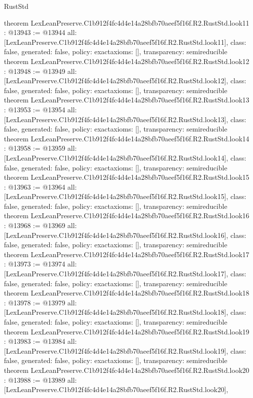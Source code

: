 \begin{lexlean}{RustStd}
\begin{coremodule}
{}
theorem LexLeanPreserve.C1b912f4fc4d4e14a28bfb70aeef5f16f.R2.RustStd.look11 : @13943 := @13944 {
  all: [LexLeanPreserve.C1b912f4fc4d4e14a28bfb70aeef5f16f.R2.RustStd.look11],
  class: false,
  generated: false,
  policy: exact{axioms: []},
  transparency: semireducible
}
theorem LexLeanPreserve.C1b912f4fc4d4e14a28bfb70aeef5f16f.R2.RustStd.look12 : @13948 := @13949 {
  all: [LexLeanPreserve.C1b912f4fc4d4e14a28bfb70aeef5f16f.R2.RustStd.look12],
  class: false,
  generated: false,
  policy: exact{axioms: []},
  transparency: semireducible
}
theorem LexLeanPreserve.C1b912f4fc4d4e14a28bfb70aeef5f16f.R2.RustStd.look13 : @13953 := @13954 {
  all: [LexLeanPreserve.C1b912f4fc4d4e14a28bfb70aeef5f16f.R2.RustStd.look13],
  class: false,
  generated: false,
  policy: exact{axioms: []},
  transparency: semireducible
}
theorem LexLeanPreserve.C1b912f4fc4d4e14a28bfb70aeef5f16f.R2.RustStd.look14 : @13958 := @13959 {
  all: [LexLeanPreserve.C1b912f4fc4d4e14a28bfb70aeef5f16f.R2.RustStd.look14],
  class: false,
  generated: false,
  policy: exact{axioms: []},
  transparency: semireducible
}
theorem LexLeanPreserve.C1b912f4fc4d4e14a28bfb70aeef5f16f.R2.RustStd.look15 : @13963 := @13964 {
  all: [LexLeanPreserve.C1b912f4fc4d4e14a28bfb70aeef5f16f.R2.RustStd.look15],
  class: false,
  generated: false,
  policy: exact{axioms: []},
  transparency: semireducible
}
theorem LexLeanPreserve.C1b912f4fc4d4e14a28bfb70aeef5f16f.R2.RustStd.look16 : @13968 := @13969 {
  all: [LexLeanPreserve.C1b912f4fc4d4e14a28bfb70aeef5f16f.R2.RustStd.look16],
  class: false,
  generated: false,
  policy: exact{axioms: []},
  transparency: semireducible
}
theorem LexLeanPreserve.C1b912f4fc4d4e14a28bfb70aeef5f16f.R2.RustStd.look17 : @13973 := @13974 {
  all: [LexLeanPreserve.C1b912f4fc4d4e14a28bfb70aeef5f16f.R2.RustStd.look17],
  class: false,
  generated: false,
  policy: exact{axioms: []},
  transparency: semireducible
}
theorem LexLeanPreserve.C1b912f4fc4d4e14a28bfb70aeef5f16f.R2.RustStd.look18 : @13978 := @13979 {
  all: [LexLeanPreserve.C1b912f4fc4d4e14a28bfb70aeef5f16f.R2.RustStd.look18],
  class: false,
  generated: false,
  policy: exact{axioms: []},
  transparency: semireducible
}
theorem LexLeanPreserve.C1b912f4fc4d4e14a28bfb70aeef5f16f.R2.RustStd.look19 : @13983 := @13984 {
  all: [LexLeanPreserve.C1b912f4fc4d4e14a28bfb70aeef5f16f.R2.RustStd.look19],
  class: false,
  generated: false,
  policy: exact{axioms: []},
  transparency: semireducible
}
theorem LexLeanPreserve.C1b912f4fc4d4e14a28bfb70aeef5f16f.R2.RustStd.look20 : @13988 := @13989 {
  all: [LexLeanPreserve.C1b912f4fc4d4e14a28bfb70aeef5f16f.R2.RustStd.look20],
}
\end{coremodule}
\end{lexlean}
